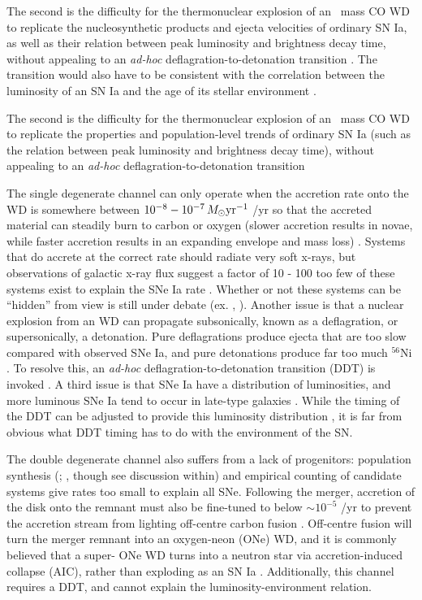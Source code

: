 {The second is the difficulty for the thermonuclear explosion of an \Mch\ mass CO WD to replicate the nucleosynthetic products and ejecta velocities of ordinary SN Ia, as well as their \cite{phil93} relation between peak luminosity and brightness decay time, without appealing to an \textit{ad-hoc} deflagration-to-detonation transition \citep{khok91}.  The transition would also have to be consistent with the correlation between the luminosity of an SN Ia and the age of its stellar environment \citep{none}.

The second is the difficulty for the thermonuclear explosion of an \Mch\ mass CO WD to replicate the properties and population-level trends of ordinary SN Ia (such as the \cite{phil93} relation between peak luminosity and brightness decay time), without appealing to an \textit{ad-hoc} deflagration-to-detonation transition \citep{khok91}


The single degenerate channel can only operate when the accretion rate onto the WD is somewhere between $10^{-8} - 10^{-7}\,\Msun\pyr$ {\Msun}/yr so that the accreted material can steadily burn to carbon or oxygen (slower accretion results in novae, while faster accretion results in an expanding envelope and mass loss) \citep{howe11}.  Systems that do accrete at the correct rate should radiate very soft x-rays, but observations of galactic x-ray flux suggest a factor of 10 - 100 too few of these systems exist to explain the SNe Ia rate \citep{dste10, gilfb10}.  Whether or not these systems can be ``hidden'' from view is still under debate (ex. \citealt{hachkn10}, \citealt{bojedn11}).  Another issue is that a nuclear explosion from an {\Mch} WD can propagate subsonically, known as a deflagration, or supersonically, a detonation.  Pure deflagrations produce ejecta that are too slow compared with observed SNe Ia, and pure detonations produce far too much $^{56}$Ni \citep{hilln00, howe11}.  To resolve this, an \textit{ad-hoc} deflagration-to-detonation transition (DDT) is invoked \citep{khok91, howe11}.  A third issue is that SNe Ia have a distribution of luminosities, and more luminous SNe Ia tend to occur in late-type galaxies \citep{sull10}.  While the timing of the DDT can be adjusted to provide this luminosity distribution \citep{hilln00,vker12}, it is far from obvious what DDT timing has to do with the environment of the SN.

The double degenerate {\Mch} channel also suffers from a lack of progenitors: population synthesis (\citealt{menn+10}; \citealt{ruitbf09}, though see discussion within) and empirical counting of candidate systems \citep{badem12} give rates too small to explain all SNe.  Following the merger, accretion of the disk onto the remnant must also be fine-tuned to below $\sim 10^{-5}$ {\Msun}/yr to prevent the accretion stream from lighting off-centre carbon fusion \citep{yoonpr07}.  Off-centre fusion will turn the merger remnant into an oxygen-neon (ONe) WD, and it is commonly believed that a super-{\Mch} ONe WD turns into a neutron star via accretion-induced collapse (AIC), rather than exploding as an SN Ia \citep{yoonpr07}.  Additionally, this channel requires a DDT, and cannot explain the luminosity-environment relation.

}
